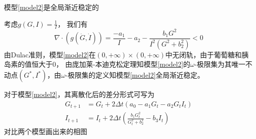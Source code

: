 \begin{prop}
    模型\ref{model2}是全局渐近稳定的
\end{prop}
\begin{pf}
    考虑$g(G,I)=\frac{1}{I}$， 我们有
    \begin{equation}
        \nabla\cdot(g(\dot{G},\dot{I}))=\frac{-a_1}{I}-a_2-\frac{b_1 G^2}{I^2(G^2 + b_2^2)}<0
    \end{equation}
    由Dulac准则，模型\ref{model2}在$(0,+\infty)\times (0,+\infty)$中无闭轨，由于葡萄糖和胰岛素的值恒大于$0$， 由庞加莱-本迪克松定理知模型\ref{model2}的$\omega$-极限集为其唯一不动点$(G^*,I^*)$，由$\omega$-极限集的定义知模型\ref{model2}全局渐近稳定。
\end{pf}
对于模型\ref{model2}，其离散化后的差分形式可写为
\begin{equation}
    \begin{aligned}
        G_{t+1} & = G_t + 2\Delta t(a_0-a_1G_t-a_2G_tI_t)  \\
        I_{t+1} & = I_t + 2\Delta t(\frac{b_1 G_t^2}{G_t^2 + b_2^2} - b_3 I_t)
    \end{aligned}
\end{equation}
对比两个模型画出来的相图
